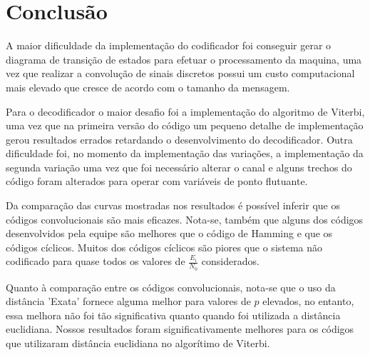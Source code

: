 \section{Conclusão}

A maior dificuldade da implementação do codificador foi conseguir gerar o diagrama de transição de estados para efetuar o processamento da maquina, uma vez que realizar a convolução de sinais discretos possui um custo computacional mais elevado que cresce de acordo com o tamanho da mensagem.

Para o decodificador o maior desafio foi a implementação do algoritmo de Viterbi, uma vez que na primeira versão do código um pequeno detalhe de implementação gerou resultados errados retardando o desenvolvimento do decodificador. Outra dificuldade foi, no momento da implementação das variações, a implementação da segunda variação uma vez que foi necessário alterar o canal e alguns trechos do código foram alterados para operar com variáveis de ponto flutuante.

Da comparação das curvas mostradas nos resultados é possível inferir que os códigos convolucionais são mais eficazes. Nota-se, também que alguns dos códigos desenvolvidos pela equipe são melhores que o código de Hamming e que os códigos cíclicos. Muitos dos códigos cíclicos são piores que o sistema não codificado para quase todos os valores de $\frac{E_i}{N_0}$ considerados.

Quanto à comparação entre os códigos convolucionais, nota-se que o uso da distância 'Exata' fornece alguma melhor para valores de $p$ elevados, no entanto, essa melhora não foi tão significativa quanto quando foi utilizada a distância euclidiana. Nossos resultados foram significativamente melhores para os códigos que utilizaram distância euclidiana no algorítimo de Viterbi.